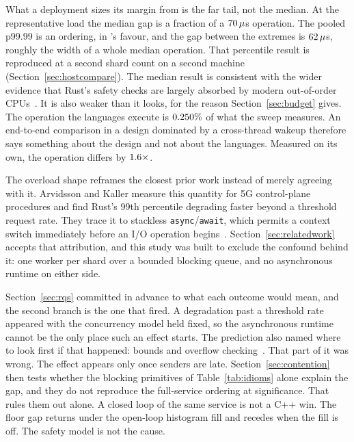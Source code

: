 \documentclass[english,oneside,a4paper,censored,csm,software-track-2020]{HYthesisML}
\begin{document}
What a deployment sizes its margin from is the far tail, not the median. At the
representative load the median gap is a fraction of a $70\,\mu$s operation. The
pooled p99.99 is an ordering, in \FarTailLower{}'s favour, and the gap between the extremes
is $62\,\mu$s, roughly the width of a whole median operation. That percentile
result is reproduced at a second shard count on a second machine
(Section~\ref{sec:hostcompare}). The median result is consistent with the wider evidence
that Rust's safety checks are largely absorbed by modern out-of-order
CPUs~\cite{balasubramanian2017rust,emmerich2019drivers}. It is also weaker than it looks,
for the reason Section~\ref{sec:budget} gives. The operation the languages execute is
$0.250\%$ of what the sweep measures. An end-to-end comparison in a design
dominated by a cross-thread wakeup therefore says something about the design and not about
the languages. Measured on its own, the operation differs by $1.6\times$.

The overload shape reframes the closest prior work instead of merely agreeing with it. Arvidsson and Kaller
measure this quantity for 5G control-plane procedures and find Rust's 99th percentile degrading
faster beyond a threshold request rate. They trace it to stackless
\texttt{async}/\texttt{await}, which permits a context switch immediately before an I/O operation
begins~\cite{arvidsson2025async}. Section~\ref{sec:relatedwork} accepts that attribution, and
this study was built to exclude the confound behind it: one worker per shard over a bounded
blocking queue, and no asynchronous runtime on either side.

Section~\ref{sec:rqs}
committed in advance to what each outcome would mean, and the second branch is the one that
fired. A degradation past a threshold rate appeared with the concurrency model held fixed, so the
asynchronous runtime cannot be the only place such an effect starts. The prediction also
named where to look first if that happened: bounds and overflow
checking~\cite{zhang2022runtime,harris2023morello}. That part of it was wrong. The effect
appears only once senders are late. Section~\ref{sec:contention}
then tests whether the blocking primitives of Table~\ref{tab:idioms} alone explain the gap, and they do not reproduce the
full-service ordering at significance. That rules them out alone.
A closed loop of the same service is not a C++ win.
The floor gap returns under the open-loop histogram fill and recedes when the fill is off.
The safety model is not the cause.
\end{document}
